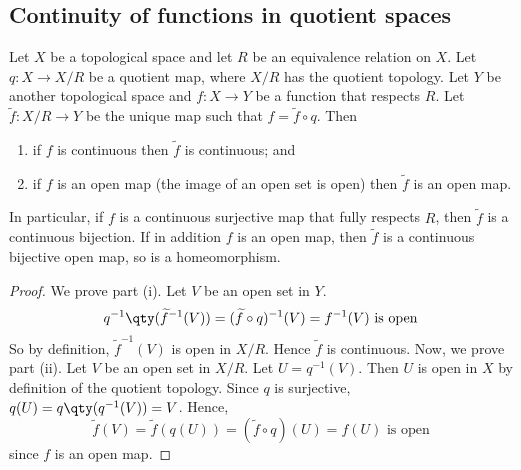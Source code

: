 \subsection{Continuity of functions in quotient spaces}
\begin{proposition}
	Let \( X \) be a topological space and let \( R \) be an equivalence relation on \( X \).
	Let \( q \colon X \to X/R \) be a quotient map, where \( X/R \) has the quotient topology.
	Let \( Y \) be another topological space and \( f \colon X \to Y \) be a function that respects \( R \).
	Let \( \widetilde f \colon X/R \to Y \) be the unique map such that \( f = \widetilde f \circ q \).
	Then
	\begin{enumerate}
		\item if \( f \) is continuous then \( \widetilde f \) is continuous; and
		\item if \( f \) is an open map (the image of an open set is open) then \( \widetilde f \) is an open map.
	\end{enumerate}
	In particular, if \( f \) is a continuous surjective map that fully respects \( R \), then \( \widetilde f \) is a continuous bijection.
	If in addition \( f \) is an open map, then \( \widetilde f \) is a continuous bijective open map, so is a homeomorphism.
\end{proposition}
\begin{proof}
	We prove part (i).
	Let \( V \) be an open set in \( Y \).
	\[
		q^{-1}\qty(\widetilde f^{-1}(V)) = (\widetilde f \circ q)^{-1}(V) = f^{-1}(V) \text{ is open}
	\]
	So by definition, \( \widetilde f^{-1}(V) \) is open in \( X/R \).
	Hence \( \widetilde f \) is continuous.
	Now, we prove part (ii).
	Let \( V \) be an open set in \( X/R \).
	Let \( U = q^{-1}(V) \).
	Then \( U \) is open in \( X \) by definition of the quotient topology.
	Since \( q \) is surjective, \( q(U) = q\qty(q^{-1}(V)) = V \).
	Hence,
	\[
		\widetilde f(V) = \widetilde f(q(U)) = (\widetilde f \circ q)(U) = f(U) \text{ is open}
	\]
	since \( f \) is an open map.
\end{proof}
